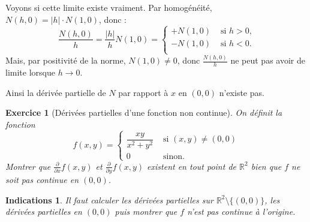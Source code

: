 \documentclass[11pt,a4paper]{article}
\newcommand{\Rr}{\mathbb{R}} \newcommand{\R}{\mathbb{R}}
\theoremstyle{exostyle}
\newtheorem{exo}{Exercice}
\newtheorem{ind}{Indications}
\newcommand{\exercice}[1]{} \newcommand{\finexercice}{}
\newcommand{\enonce}{\begin{exo}} \newcommand{\finenonce}{\end{exo}}
\newcommand{\indication}{\begin{ind}} \newcommand{\finindication}{\end{ind}}
\begin{document}
Voyons si cette limite existe vraiment.
Par homogénéité, $N(h, 0) = |h| \cdot N(1, 0)$, donc :
\[
\frac{N(h, 0)}{h} = \frac{|h|}{h}{N(1,0)} 
= \begin{cases} 
	+N(1,0) & \text{ si $h>0$,} \\
	-N(1,0) & \text{ si $h<0$.} \\	
\end{cases}
\]
Mais, par positivité de la norme, $N(1,0) \neq 0$, donc $\frac{N(h, 0)}{h}$
ne peut pas avoir de limite lorsque $h \to 0$.

Ainsi la dérivée partielle de $N$ par rapport à $x$ en $(0,0)$ n'existe pas.
\fincorrection
\finexercice




\exercice{1818, drutu, 2003/10/01}

\enonce[Dérivées partielles d'une fonction non continue]
On définit la fonction
$$
f(x,y)=\left\{
\begin{array}{cc}
	\dfrac{xy}{x^2+y^2} & \mbox{ si }(x,y) \neq (0,0) \\[2ex]
	0 & \mbox{ sinon. }
\end{array}
\right .
$$
Montrer que $\frac{\partial }{\partial x} f(x,y)$ et $\frac{\partial }{\partial y}f(x,y)$ 
existent en tout point de $\R^2$ bien 
que $f$ ne soit pas continue en $(0,0)$.
\finenonce

\indication
Il faut calculer les dérivées partielles sur $\Rr^2 \setminus \{(0,0)\}$,
les dérivées partielles en $(0,0)$ puis montrer que $f$ n'est pas continue à l'origine.
\finindication
\end{document}
